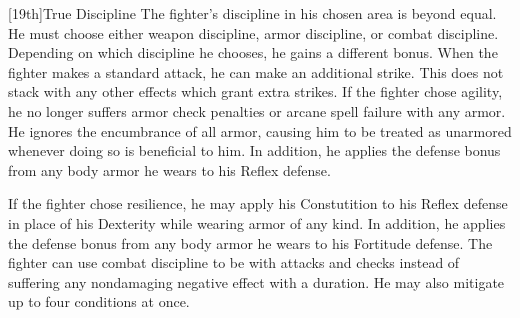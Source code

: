         [19th]{True Discipline}
        The fighter's discipline in his chosen area is beyond equal.
        He must choose either weapon discipline, armor discipline, or combat discipline.
        Depending on which discipline he chooses, he gains a different bonus.
        When the fighter makes a standard attack, he can make an additional strike.
        This does not stack with any other effects which grant extra strikes.
        If the fighter chose agility, he no longer suffers armor check penalties or arcane spell failure with any armor.
        He ignores the encumbrance of all armor, causing him to be treated as unarmored whenever doing so is beneficial to him.
        In addition, he applies the defense bonus from any body armor he wears to his Reflex defense.

        If the fighter chose resilience, he may apply his Constutition to his Reflex defense in place of his Dexterity while wearing armor of any kind.
        In addition, he applies the defense bonus from any body armor he wears to his Fortitude defense.
        The fighter can use combat discipline to be \impaired with attacks and checks instead of suffering any nondamaging negative effect with a duration.
        He may also mitigate up to four conditions at once.

